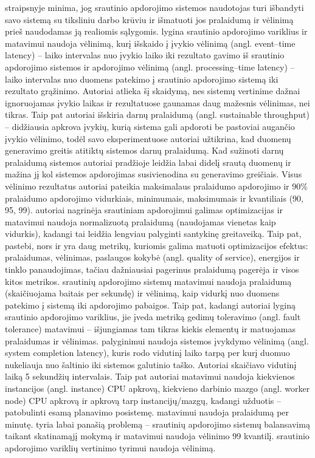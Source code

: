 \documentclass{VUMIFPSbakalaurinis}
\begin{document}
\cite{stonebraker20058} straipsnyje minima, jog srautinio apdorojimo sistemos naudotojas turi išbandyti savo sistemą su tiksliniu darbo krūviu ir išmatuoti jos pralaidumą ir vėlinimą prieš naudodamas ją realiomis sąlygomis. \cite{Karimov2018BenchmarkingDS} lygina srautinio apdorojimo variklius ir matavimui naudoja vėlinimą, kurį išskaido į įvykio vėlinimą (angl. event–time latency) – laiko intervalas nuo įvykio laiko iki rezultato gavimo iš srautinio apdorojimo sistemos ir apdorojimo vėlinimą (angl. processing–time latency) – laiko intervalas nuo duomens patekimo į srautinio apdorojimo sistemą iki rezultato grąžinimo. Autoriai atlieka šį skaidymą, nes sistemų vertinime dažnai ignoruojamas įvykio laikas ir rezultatuose gaunamas daug mažesnis vėlinimas, nei tikras. Taip pat autoriai išskiria darnų pralaidumą (angl. sustainable throughput) – didžiausia apkrova įvykių, kurią sistema gali apdoroti be pastoviai augančio įvykio vėlinimo, todėl savo eksperimentuose autoriai užtikrina, kad duomenų generavimo greitis atitiktų sistemos darnų pralaidumą. Kad sužinoti darnų pralaidumą sistemos autoriai pradžioje leidžia labai didelį srautą duomenų ir mažina jį kol sistemos apdorojimas susivienodina su generavimo greičiais. Visus vėlinimo rezultatus autoriai pateikia maksimalaus pralaidumo apdorojimo ir 90\% pralaidumo apdorojimo vidurkiais, minimumais, maksimumais ir kvantiliais (90, 95, 99). \cite{hirzel2014catalog} autoriai nagrinėja srautiniam apdorojimui galimas optimizacijas ir matavimui naudoja normalizuotą pralaidumą (naudojamas vienetas kaip vidurkis), kadangi tai leidžia lengviau palyginti santykinę greitaveiką. Taip pat, \cite{hirzel2014catalog} pastebi, nors ir yra daug metrikų, kuriomis galima matuoti optimizacijos efektus: pralaidumas, vėlinimas, paslaugos kokybė (angl. quality of service), energijos ir tinklo panaudojimas, tačiau dažniausiai pagerinus pralaidumą pagerėja ir visos kitos metrikos. \cite{Qian2016Benchmarking} srautinių apdorojimo sistemų matavimui naudoja pralaidumą (skaičiuojama baitais per sekundę) ir vėlinimą, kaip vidurkį nuo duomens patekimo į sistemą iki apdorojimo pabaigos. Taip pat, kadangi autoriai lyginą srautinio apdorojimo variklius, jie įveda metriką gedimų toleravimo (angl. fault tolerance) matavimui – išjungiamas tam tikras kiekis elementų ir matuojamas pralaidumas ir vėlinimas. \cite{zhang2020heron} palyginimui naudoja sistemos įvykdymo vėlinimą (angl. system completion latency), kuris rodo vidutinį laiko tarpą per kurį duomuo nukeliauja nuo šaltinio iki sistemos galutinio taško. Autoriai skaičiavo vidutinį laiką 5 sekundžių intervalais. Taip pat autoriai matavimui naudoja kiekvienos instancijos (angl. instance) CPU apkrovą, kiekvieno darbinio mazgo (angl. worker node) CPU apkrovą ir apkrovą tarp instancijų/mazgų, kadangi \cite{zhang2020heron} užduotis – patobulinti esamą planavimo posistemę. \cite{dhalion} matavimui naudoja pralaidumą per minutę. \cite{vaquero2018autotuning} tyria labai panašią problemą – srautinių apdorojimo sistemų balansavimą taikant skatinamąjį mokymą ir matavimui naudoja vėlinimo 99 kvantilį. \cite{Chintapalli2016Benchmarking} srautinio apdorojimo variklių vertinimo tyrimui naudoja vėlinimą.
\end{document}
